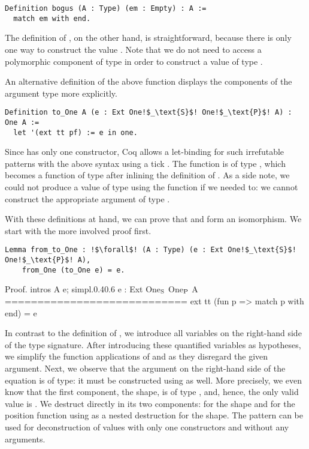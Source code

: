 \begin{verbatim}
Definition bogus (A : Type) (em : Empty) : A :=
  match em with end.
\end{verbatim}

The definition of , on the other hand, is straightforward, because there is only one way to construct the value .
Note that we do not need to access a polymorphic component of type  in order to construct a value of type .

An alternative definition of the above function displays the components of the argument type  more explicitly.

\begin{verbatim}
Definition to_One A (e : Ext One!$_\text{S}$! One!$_\text{P}$! A) : One A :=
  let '(ext tt pf) := e in one.
\end{verbatim}

Since  has only one constructor, Coq allows a let-binding for such irrefutable patterns with the above syntax using a tick .
The function  is of type , which becomes a function of type  after inlining the definition of .
As a side note, we could not produce a value of type  using the function  if we needed to: we cannot construct the appropriate argument of type .

With these definitions at hand, we can prove that  and  form an isomorphism.
We start with the more involved proof  first.

\begin{verbatim}
Lemma from_to_One : !$\forall$! (A : Type) (e : Ext One!$_\text{S}$! One!$_\text{P}$! A),
    from_One (to_One e) = e.
\end{verbatim}

\begin{cproof1}{Proof. intros A e; simpl.}{0.4}{0.6}
  e : Ext One\(\sb{\text{S}}\) One\(\sb{\text{P}}\) A
  ============================
  ext tt (fun p => match p with end) = e
\end{cproof1}

In contrast to the definition of , we introduce all variables on the right-hand side of the type signature.
After introducing these quantified variables as hypotheses, we simplify the function applications of  and  as they disregard the given argument.
Next, we observe that the argument  on the right-hand side of the equation is of type: it must be constructed using  as well.
More precisely, we even know that the first component, the shape, is of type , and, hence, the only valid value is .
We destruct  directly in its two components:  for the shape and  for the position function using \cinl{[]} as a nested destruction for the shape.
The pattern \cinl{[]} can be used for deconstruction of values with only one constructors and without any arguments.

